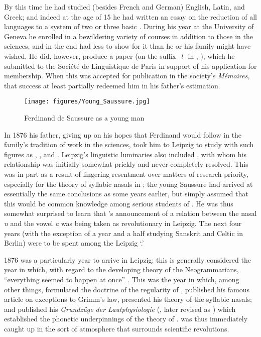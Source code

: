 By this time he had studied (besides {French} and {German}) {English},
{Latin}, and {Greek}; and indeed at the age of 15 he had written an essay
on the reduction of all languages to a system of two or three basic
. During his year at the University of Geneva he enrolled in
a bewildering variety of courses in addition to those in the sciences,
and in the end had less to show for it than he or his family might
have wished. He did, however, produce a paper (on the suffix
\emph{-t-} in , \citealt{saussure77:suffix.t}), which he
submitted to the Société de Linguistique de Paris in support of his
application for membership. When this was accepted for
publication in the society's \emph{Mémoires,} that success at least
partially redeemed him in his father's estimation.

\begin{wrapfigure}[14]{l}{.4\textwidth}
  \texttt{[image: figures/Young\_Saussure.jpg]}
  \caption{Ferdinand de Saussure as a young man}
  \label{fig:ch.saussure_life.young_saussure}
\end{wrapfigure}
In 1876 his father, giving up on his hopes that Ferdinand {\Saussure} would follow
in the family's tradition of work in the sciences, took him to {Leipzig}
to study  with such figures as , ,  and . {Leipzig}'s linguistic
luminaries also included , with whom his relationship was
initially somewhat prickly and never completely resolved.  This was in
part as a result of lingering resentment over matters of research
priority, especially for the theory of syllabic nasals in
; the young Saussure had arrived at essentially the same
conclusions as {\Brugmann} some years earlier, but simply assumed that
this would be common knowledge among serious students of
. He was thus somewhat surprised to learn that {\Brugmann}'s
announcement of a relation between the nasal \emph{n} and the vowel
\emph{a} was being taken as revolutionary in {Leipzig}. The next four
years (with the exception of a year and a half studying {Sanskrit} and
Celtic in Berlin) were to be spent among the {Leipzig}
`.'

1876 was a particularly  year to arrive in {Leipzig}: this is
generally considered the year in which, with regard to the developing
theory of the Neo\-grammarians, ``everything seemed to happen at once''
\citep{hoenigswald78:annus.mirabilis}. This was the year in which,
among other things, {\Leskien} formulated the doctrine of the regularity
of , {\Verner} published his famous article on exceptions to
Grimm's law, {\Brugmann} presented his theory of the syllabic nasals; and
{\Sievers} published his \textsl{Grundz\"uge der Lautphysiologie}
(\citealt{sievers76:lautphysiologie}, later revised as
\citealt{sievers:phonetik}) which established the phonetic
underpinnings of the theory of .  {\Saussure} was thus
immediately caught up in the sort of atmosphere that surrounds
scientific revolutions.

